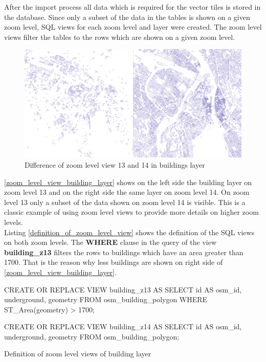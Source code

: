 After the import process all \osm{} data which is required for the vector tiles is stored in the database. Since only a subset of the data in the tables is shown on a given zoom level, SQL views for each zoom level and layer were created. The zoom level views filter the tables to the rows which are shown on a given zoom level.

\begin{figure}[H]
  \centering
  \includegraphics[width=\textwidth]{images/buildings_z13_z14}
  \caption{Difference of zoom level view 13 and 14 in buildings layer}
  \label{zoom_level_view_building_layer}
\end{figure}

\autoref{zoom_level_view_building_layer} shows on the left side the building layer on zoom level 13 and on the right side the same layer on zoom level 14. On zoom level 13 only a subset of the data shown on zoom level 14 is visible. This is a classic example of using zoom level views to provide more details on higher zoom levels.
\\
Listing \autoref{definition_of_zoom_level_view} shows the definition of the SQL views on both zoom levels. The \textbf{WHERE} clause in the query of the view \textbf{building\_z13} filters the rows to buildings which have an area greater than 1700. That is the reason why less buildings are shown on right side of \autoref{zoom_level_view_building_layer}.

\begin{listing}[H]
\begin{sqlcode}
CREATE OR REPLACE VIEW building_z13 AS
    SELECT id AS osm_id, underground, geometry
    FROM osm_building_polygon
    WHERE ST_Area(geometry) > 1700;

CREATE OR REPLACE VIEW building_z14 AS
    SELECT id AS osm_id, underground, geometry
    FROM osm_building_polygon;
\end{sqlcode}
\caption{Definition of zoom level views of building layer}
\label{definition_of_zoom_level_view}
\end{listing}

